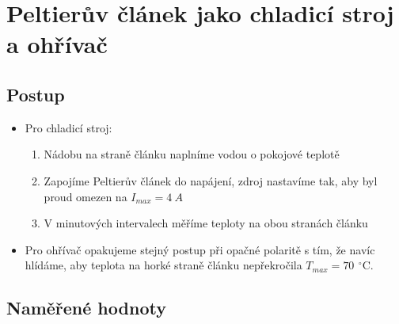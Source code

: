 \documentclass[a4paper,12pt]{article}
\newcommand{\unitC}{\,^\circ\mathrm{C}}
\begin{document}
\section{Peltierův článek jako chladicí stroj a ohřívač}
\subsection{Postup}
\begin{itemize}
    \item Pro chladicí stroj:
        \begin{enumerate}
        \item Nádobu na straně článku naplníme vodou o pokojové teplotě
        \item Zapojíme Peltierův článek do napájení, zdroj nastavíme tak, aby byl proud omezen na $I_{max} = 4\ \unit{A}$
        \item V minutových intervalech měříme teploty na obou stranách článku
    \end{enumerate}
    \item Pro ohřívač opakujeme stejný postup při opačné polaritě s tím, že navíc hlídáme, aby teplota na horké straně článku nepřekročila $T_{max} = 70\ \unitC$.
    
\end{itemize}

\subsection{Naměřené hodnoty}
\end{document}
